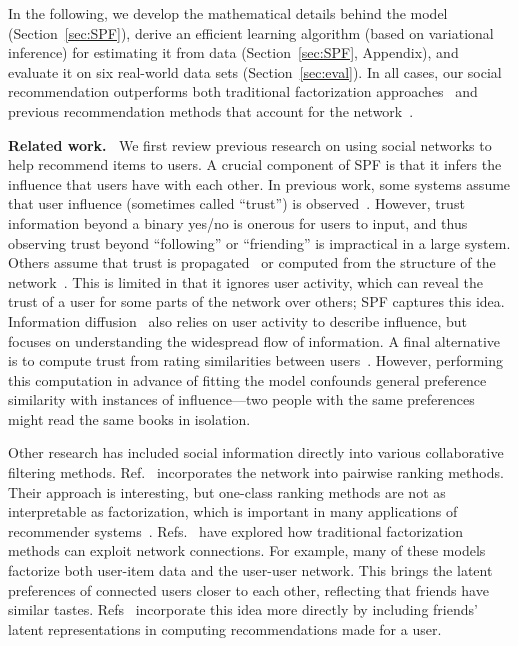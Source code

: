 \documentclass{sig-alternate-2013}
\newcommand{\mypar}[1]{\vspace{0.05in} \noindent \textbf{#1 \,}}
\begin{document}
In the following, we develop the mathematical details behind the model
(Section~\ref{sec:SPF}), derive an efficient learning algorithm (based
on variational inference) for estimating it from data
(Section~\ref{sec:SPF}, Appendix), and evaluate it on six real-world data
sets (Section~\ref{sec:eval}).  In all cases, our social
recommendation outperforms both traditional factorization approaches~\cite{poisMF,PMF}
and previous recommendation methods that account for the network~\cite{guo2015trustsvd,Jamali:2010,Ma:2009,SoRec,Yang2013}.

\mypar{Related work.} We first review previous research on using
social networks to help recommend items to users.  A crucial component
of SPF is that it infers the influence that users have with each
other.  In previous work, some systems assume that user influence
(sometimes called ``trust'') is observed~\cite{Massa2007}.  However,
trust information beyond a binary yes/no is onerous for users to
input, and thus observing trust beyond ``following'' or ``friending''
is impractical in a large system.  Others assume that trust is
propagated~\cite{Andersen2008} or computed from the structure of the
network~\cite{FilmTrust}.  This is limited in that it ignores user
activity, which can reveal the trust of a user for some parts of the
network over others; SPF captures this idea.
Information diffusion~\cite{Du:2013,Guille:2013} also relies on user
activity to describe influence, but focuses on understanding the
widespread flow of information.  A final alternative is
to compute trust from rating similarities between users~\cite{Fazeli:2014}.
However, performing this computation in advance of fitting the model
confounds general preference similarity with instances of
influence---two people with the same preferences might read the same
books in isolation.

Other research has included social information directly into various
collaborative filtering methods. Ref.~\cite{SBPR} incorporates the
network into pairwise ranking methods.  Their approach is interesting,
but one-class ranking methods are not as interpretable as factorization,
which is important in many applications of recommender systems~\cite{Herlocker2000}.
Refs.~\cite{SoRec, CTRrec2012, Yang2013} have explored how traditional
factorization methods can exploit network connections.  For example,
many of these models factorize both user-item data and the user-user
network.  This brings the latent preferences of connected users closer
to each other, reflecting that friends have similar tastes.
Refs~\cite{Ma:2009,Ye:2012} incorporate this idea more directly by
including friends' latent representations in computing recommendations
made for a user.
\end{document}
